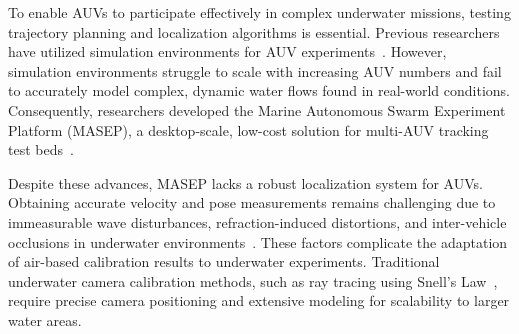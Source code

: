 \documentclass[11pt]{article}
\begin{document}
        To enable AUVs to participate effectively in complex underwater missions, testing trajectory planning and localization algorithms is essential. Previous researchers have utilized simulation environments for AUV experiments~\cite{agrawal_underwater_2025}. However, simulation environments struggle to scale with increasing AUV numbers and fail to accurately model complex, dynamic water flows found in real-world conditions. Consequently, researchers developed the Marine Autonomous Swarm Experiment Platform (MASEP), a desktop-scale, low-cost solution for multi-AUV tracking test beds~\cite{cai_development_2024}.

        Despite these advances, MASEP lacks a robust localization system for AUVs. Obtaining accurate velocity and pose measurements remains challenging due to immeasurable wave disturbances, refraction-induced distortions, and inter-vehicle occlusions in underwater environments~\cite{pedersen_camera_2018, cai_data-driven_2025}. These factors complicate the adaptation of air-based calibration results to underwater experiments. Traditional underwater camera calibration methods, such as ray tracing using Snell's Law~\cite{pedersen_camera_2018}, require precise camera positioning and extensive modeling for scalability to larger water areas. \\ \\
        


\end{document}
